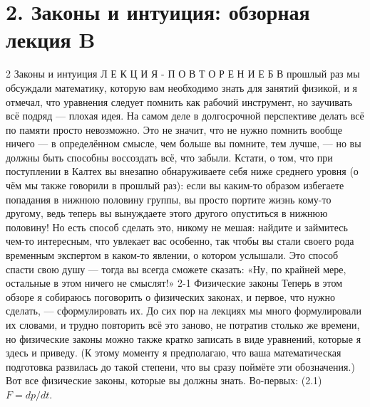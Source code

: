 \documentclass[10pt,oneside]{article}
\begin{document}
\section*{2. Законы и интуиция: обзорная лекция B}
\label{tips-sec-10-2-законы-и-интуиция-обзорная-лекция-b}
2 Законы и интуиция Л Е К Ц И Я - П О В Т О Р Е Н И Е   Б В прошлый раз мы обсуждали математику, которую вам необходимо знать для занятий физикой, и я отмечал, что уравнения следует помнить как рабочий инструмент, но заучивать всё подряд --- плохая идея. На самом деле в долгосрочной перспективе делать всё по памяти просто невозможно. Это не значит, что не нужно помнить вообще ничего --- в определённом смысле, чем больше вы помните, тем лучше, --- но вы должны быть способны воссоздать всё, что забыли. Кстати, о том, что при поступлении в Калтех вы внезапно обнаруживаете себя ниже среднего уровня (о чём мы также говорили в прошлый раз): если вы каким-то образом избегаете попадания в нижнюю половину группы, вы просто портите жизнь кому-то другому, ведь теперь вы вынуждаете этого другого опуститься в нижнюю половину! Но есть способ сделать это, никому не мешая: найдите и займитесь чем-то интересным, что увлекает вас особенно, так чтобы вы стали своего рода временным экспертом в каком-то явлении, о котором услышали. Это способ спасти свою душу --- тогда вы всегда сможете сказать: «Ну, по крайней мере, остальные в этом ничего не смыслят!» 2-1 Физические законы Теперь в этом обзоре я собираюсь поговорить о физических законах, и первое, что нужно сделать, --- сформулировать их. До сих пор на лекциях мы много формулировали их словами, и трудно повторить всё это заново, не потратив столько же времени, но физические законы можно также кратко записать в виде уравнений, которые я здесь и приведу. (К этому моменту я предполагаю, что ваша математическая подготовка развилась до такой степени, что вы сразу поймёте эти обозначения.) Вот все физические законы, которые вы должны знать. Во-первых: (2.1) \(F = dp/dt\).\par
\end{document}
